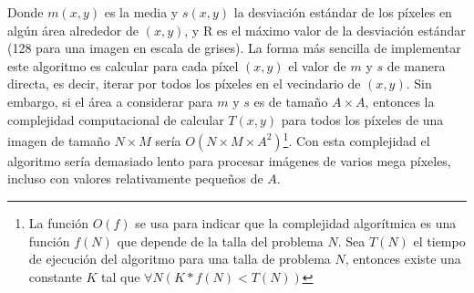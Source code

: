 \documentclass[a4paper, 11pt, oneside]{report}
\begin{document}
Donde $m(x,y)$ es la media y $s(x,y)$ la desviación estándar de los píxeles en algún área alrededor de $(x,y)$, y R es el máximo valor de la desviación estándar (128 para una imagen en escala de grises). La forma más sencilla de implementar este algoritmo es calcular para cada píxel $(x,y)$ el valor de $m$ y $s$ de manera directa, es decir, iterar por todos los píxeles en el vecindario de $(x,y)$. Sin embargo, si el área a considerar para $m$ y $s$ es de tamaño $A \times A$, entonces la complejidad computacional de calcular $T(x,y)$ para todos los píxeles de una imagen de tamaño $N \times M$ sería $O(N \times M \times A^{2})$\footnote{La función $O(f)$ se usa para indicar que la complejidad algorítmica es una función $f(N)$ que depende de la talla del problema $N$. Sea $T(N)$ el tiempo de ejecución del algoritmo para una talla de problema $N$, entonces existe una constante $K$ tal que $\forall N ( K*f(N) < T(N) ) $}. Con esta complejidad el algoritmo sería demasiado lento para procesar imágenes de varios mega píxeles, incluso con valores relativamente pequeños de $A$.
\end{document}
